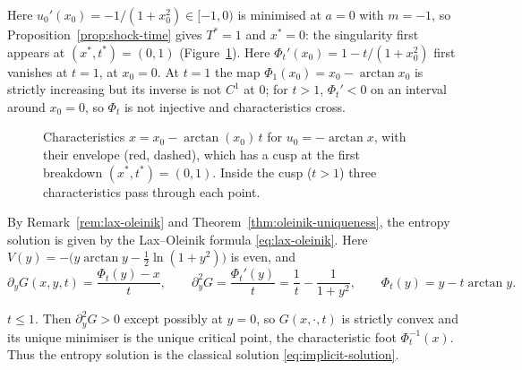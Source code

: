 Here $u_0'(x_0)=-1/(1+x_0^2)\in[-1,0)$ is minimised at $a=0$ with $m=-1$, so
Proposition~\ref{prop:shock-time} gives $T^*=1$ and $x^*=0$: the singularity
first appears at $(x^*,t^*)=(0,1)$ (Figure~\ref{fig:characteristics}). Here
$\Phi_t'(x_0)=1-t/(1+x_0^2)$ first vanishes at $t=1$, at $x_0=0$. At $t=1$ the
map $\Phi_1(x_0)=x_0-\arctan x_0$ is strictly increasing but its inverse is
not $C^1$ at $0$; for $t>1$, $\Phi_t'<0$ on an interval around $x_0=0$, so
$\Phi_t$ is not injective and characteristics cross.

\begin{figure}[h]
\centering
{}
\caption{Characteristics $x=x_0-\arctan(x_0)\,t$ for $u_0=-\arctan x$, with
their envelope (red, dashed), which has a cusp at the first breakdown
$(x^*,t^*)=(0,1)$. Inside the cusp ($t>1$) three characteristics pass through
each point.}
\label{fig:characteristics}
\end{figure}

By Remark~\ref{rem:lax-oleinik} and Theorem~\ref{thm:oleinik-uniqueness}, the
entropy solution is given by the Lax--Oleinik formula \eqref{eq:lax-oleinik}.
Here $V(y)=-\big(y\arctan y-\tfrac12\ln(1+y^2)\big)$ is even, and
\begin{equation*}
  \partial_yG(x,y,t)=\frac{\Phi_t(y)-x}{t},\qquad
  \partial_y^2G=\frac{\Phi_t'(y)}{t}=\frac1t-\frac1{1+y^2},\qquad
  \Phi_t(y)=y-t\arctan y .
\end{equation*}

\emph{$t\le1$.} Then $\partial_y^2G>0$ except possibly at $y=0$, so $G(x,\cdot,t)$ is strictly convex and its unique
minimiser is the unique critical point, the characteristic foot $\Phi_t^{-1}(x)$.
Thus the entropy solution is the classical solution
\eqref{eq:implicit-solution}.

